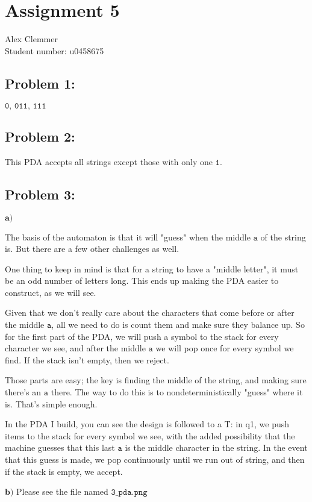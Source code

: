 \documentclass[a4paper]{article}
\begin{document}
\section*{Assignment 5 }
Alex Clemmer\\
Student number: u0458675

\subsection*{Problem 1:} $\texttt{0, 011, 111}$

\subsection*{Problem 2:} This PDA accepts all strings except those with only one $\texttt{1}$.

\subsection*{Problem 3:} $\textbf{a)}$

The basis of the automaton is that it will "guess" when the middle $\texttt{a}$ of the string is. But there are a few other challenges as well.

One thing to keep in mind is that for a string to have a "middle letter", it must be an odd number of letters long. This ends up making the PDA easier to construct, as we will see.

Given that we don't really care about the characters that come before or after the middle $\texttt{a}$, all we need to do is count them and make sure they balance up. So for the first part of the PDA, we will push a symbol to the stack for every character we see, and after the middle $\texttt{a}$ we will pop once for every symbol we find. If the stack isn't empty, then we reject.

Those parts are easy; the key is finding the middle of the string, and making sure there's an $\texttt{a}$ there. The way to do this is to nondeterministically "guess" where it is. That's simple enough.

In the PDA I build, you can see the design is followed to a T: in q1, we push items to the stack for every symbol we see, with the added possibility that the machine guesses that this last $\texttt{a}$ is the middle character in the string. In the event that this guess is made, we pop continuously until we run out of string, and then if the stack is empty, we accept.


$\textbf{b)}$ Please see the file named $\texttt{3\_pda.png}$
\end{document}
